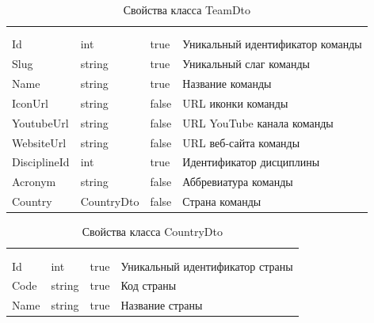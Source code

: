 \begin{xltabular}{\textwidth}{|X|X|X|X|}
	\caption{Свойства класса TeamDto}\label{table:TeamDto}\\ \hline
	 &  &  &  \\ \hline
	 &  &  &  \\ \hline
	\endfirsthead
	 \hline
	 &  &  &  \\ \hline
	\endhead
	Id & int & true & Уникальный идентификатор команды \\ \hline
	Slug & string & true & Уникальный слаг команды \\ \hline
	Name & string & true & Название команды \\ \hline
	IconUrl & string & false & URL иконки команды \\ \hline
	YoutubeUrl & string & false & URL YouTube канала команды \\ \hline
	WebsiteUrl & string & false & URL веб-сайта команды \\ \hline
	DisciplineId & int & true & Идентификатор дисциплины \\ \hline
	Acronym & string & false & Аббревиатура команды \\ \hline
	Country & CountryDto & false & Страна команды \\ \hline
\end{xltabular}

\begin{xltabular}{\textwidth}{|X|X|X|X|}
	\caption{Свойства класса CountryDto}\label{table:CountryDto}\\ \hline
	 &  &  &  \\ \hline
	 &  &  &  \\ \hline
	\endfirsthead
	 \hline
	 &  &  &  \\ \hline
	\endhead
	Id & int & true & Уникальный идентификатор страны \\ \hline
	Code & string & true & Код страны \\ \hline
	Name & string & true & Название страны \\ \hline
\end{xltabular}

